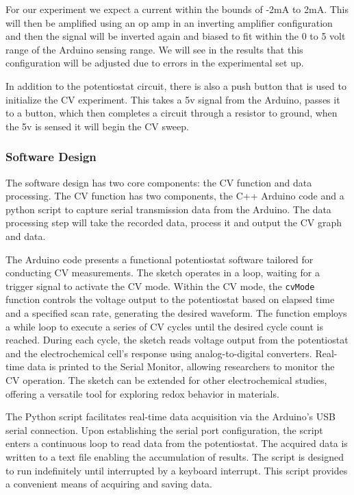 \documentclass{article}
\begin{document}
For our experiment we expect a current within the bounds of -2mA to 2mA. This will then be amplified using an op amp in an inverting amplifier configuration and then the signal will be inverted again and biased to fit within the 0 to 5 volt range of the Arduino sensing range. We will see in the results that this configuration will be adjusted due to errors in the experimental set up.

In addition to the potentiostat circuit, there is also a push button that is used to initialize the CV experiment. This takes a 5v signal from the Arduino, passes it to a button, which then completes a circuit through a resistor to ground, when the 5v is sensed it will begin the CV sweep.

\subsubsection*{Software Design}

The software design has two core components: the CV function and data processing. The CV function has two components, the C++ Arduino code and a python script to capture serial transmission data from the Arduino. The data processing step will take the recorded data, process it and output the CV graph and data.

The Arduino code presents a functional potentiostat software tailored for conducting CV measurements. The sketch operates in a loop, waiting for a trigger signal to activate the CV mode. Within the CV mode, the \texttt{cvMode} function controls the voltage output to the potentiostat based on elapsed time and a specified scan rate, generating the desired waveform. The function employs a while loop to execute a series of CV cycles until the desired cycle count is reached. During each cycle, the sketch reads voltage output from the potentiostat and the electrochemical cell's response using analog-to-digital converters. Real-time data is printed to the Serial Monitor, allowing researchers to monitor the CV operation. The sketch can be extended for other electrochemical studies, offering a versatile tool for exploring redox behavior in materials.

The Python script facilitates real-time data acquisition via the Arduino's USB serial connection. Upon establishing the serial port configuration, the script enters a continuous loop to read data from the potentiostat. The acquired data is written to a text file enabling the accumulation of results. The script is designed to run indefinitely until interrupted by a keyboard interrupt. This script provides a convenient means of acquiring and saving data.
\end{document}
